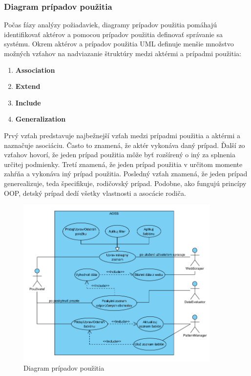 \documentclass[twoside,slovak, a4paper]{article}
\begin{document}
\subsubsection*{Diagram prípadov použitia}\label{DESIGN:UCD}

Počas fázy analýzy požiadaviek, diagramy prípadov použitia pomáhajú identifikovať aktérov a pomocou prípadov použitia definovať správanie sa systému. Okrem aktérov a prípadov použitia UML definuje menšie množstvo možných vzťahov na nadviazanie štruktúry medzi aktérmi a prípadmi použitia:

\begin{enumerate}
    \item \textbf{Association}
    \item \textbf{Extend}
    \item \textbf{Include}
    \item \textbf{Generalization}
\end{enumerate}

Prvý vzťah predstavuje najbežnejší vzťah medzi prípadmi použitia a aktérmi a naznačuje asociáciu. Často to znamená, že aktér vykonáva daný prípad. Ďalší zo vzťahov hovorí, že jeden prípad použitia môže byť rozšírený o iný za splnenia určitej podmienky. Tretí znamená, že jeden prípad použitia v určitom momente zahŕňa a vykonáva iný prípad použitia. Posledný vzťah znamená, že jeden prípad generealizuje, teda špecifikuje, rodičovský prípad. Podobne, ako fungujú princípy OOP, detský prípad dedí všetky vlastnosti a asocácie rodiča.\cite{von2002modeling}

\begin{figure}[tbh]
    \centering
    \includegraphics[width=0.9\textwidth]{pics/design/use_case_diag.png}
    \caption{Diagram prípadov použitia}
    \label{fig:8}
\end{figure}
\end{document}
